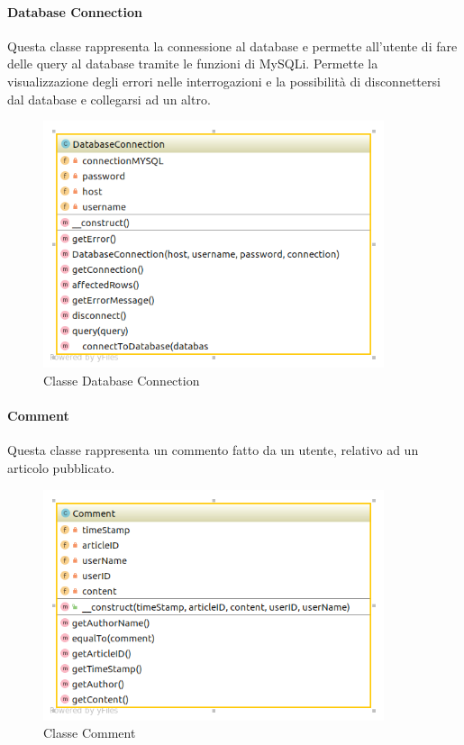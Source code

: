 \paragraph{Database Connection} Questa classe rappresenta la connessione al database e permette all'utente di fare delle query al database tramite le funzioni di MySQLi. Permette la visualizzazione degli errori nelle interrogazioni e la possibilità di disconnettersi dal database e collegarsi ad un altro.
\begin{figure}[H]
	\begin{center}
		\includegraphics[width=10cm]{img/DatabaseConnection.png}
		\caption{Classe Database Connection}
	\end{center}
\end{figure}

\paragraph{Comment} Questa classe rappresenta un commento fatto da un utente, relativo ad un articolo pubblicato.
\begin{figure}[H]
	\begin{center}
		\includegraphics[width=10cm]{img/Comment.png}
		\caption{Classe Comment}
	\end{center}
\end{figure}
\pagebreak
